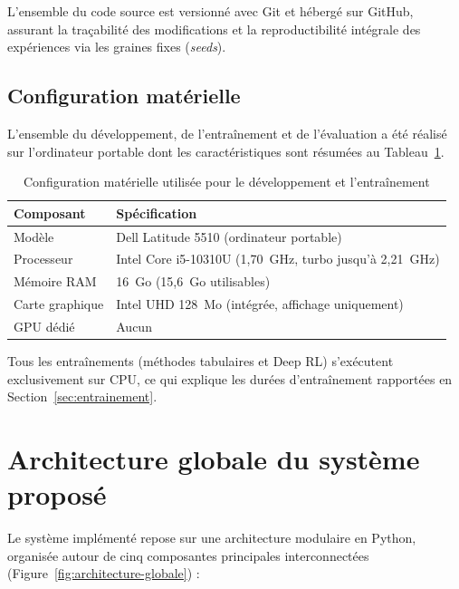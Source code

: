 \documentclass[11pt,a4paper]{report}
\begin{document}
L'ensemble du code source est versionné avec Git et hébergé sur GitHub, assurant la traçabilité des modifications et la reproductibilité intégrale des expériences via les graines fixes (\textit{seeds}).

\subsection{Configuration matérielle}

L'ensemble du développement, de l'entraînement et de l'évaluation a été réalisé sur l'ordinateur portable dont les caractéristiques sont résumées au Tableau~\ref{tab:config-materielle}.

\begin{table}[H]
\centering
\caption{Configuration matérielle utilisée pour le développement et l'entraînement}
\label{tab:config-materielle}
\begin{tabular}{ll}
\toprule
\textbf{Composant} & \textbf{Spécification} \\
\midrule
Modèle & Dell Latitude 5510 (ordinateur portable) \\
Processeur & Intel Core i5-10310U (1,70~GHz, turbo jusqu'à 2,21~GHz) \\
Mémoire RAM & 16~Go (15,6~Go utilisables) \\
Carte graphique & Intel UHD 128~Mo (intégrée, affichage uniquement) \\
GPU dédié & Aucun \\
\bottomrule
\end{tabular}
\end{table}

Tous les entraînements (méthodes tabulaires et Deep RL) s'exécutent exclusivement sur CPU, ce qui explique les durées d'entraînement rapportées en Section~\ref{sec:entrainement}.

\section{Architecture globale du système proposé}
\label{sec:architecture}

Le système implémenté repose sur une architecture modulaire en Python, organisée autour de cinq composantes principales interconnectées (Figure~\ref{fig:architecture-globale}) :
\end{document}
